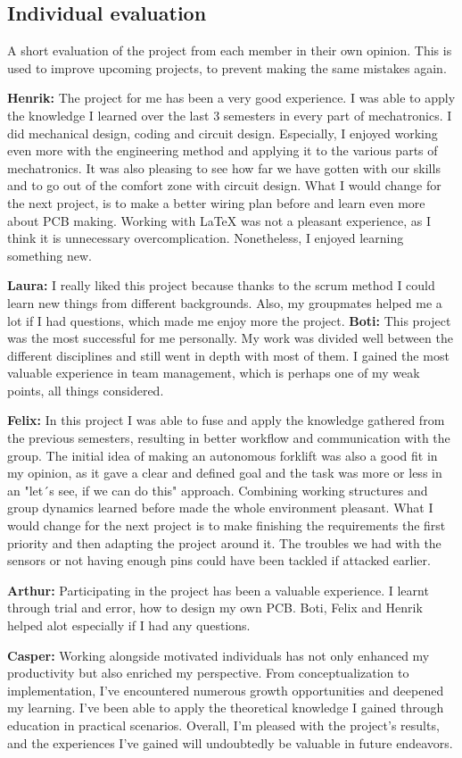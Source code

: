 \documentclass[../report.tex]{subfiles}
\begin{document}
\subsection{Individual evaluation}
A short evaluation of the project from each member in their own opinion. This is used to improve
upcoming projects, to prevent making the same mistakes again.

\textbf{Henrik:}
The project for me has been a very good experience. I was able to apply the knowledge
I learned over the last 3 semesters in every part of mechatronics. I did mechanical
design, coding and circuit design. Especially, I enjoyed working even more
with the engineering method and applying it to the various parts of mechatronics. 
It was also pleasing to see how far we have gotten with our skills and to go out of the comfort zone with circuit design. What I would change for the
next project, is to make a better wiring plan before and learn even more about PCB making.
Working with LaTeX was not a pleasant
experience, as I think it is unnecessary overcomplication. Nonetheless, I enjoyed learning something new.


\textbf{Laura:}
I really liked this project because thanks to the scrum method I could learn new things from different 
backgrounds. Also, my groupmates helped me a lot if I had questions, which made me enjoy more the project.
\textbf{Boti:}
This project was the most successful for me personally. My work was divided well between the different disciplines
and still went in depth with most of them. I gained the most valuable experience in team management, which is perhaps one of
my weak points, all things considered.

\textbf{Felix:}
In this project I was able to fuse and apply the knowledge gathered from the previous semesters, resulting in better 
workflow and communication with the group. The initial idea of making an autonomous forklift was also a good fit 
in my opinion, as it gave a clear and defined goal and the task was more or less in an "let´s see, if we can do this" 
approach. Combining working structures and group dynamics learned before made the whole environment pleasant.  What I would 
change for the next project is to make finishing the requirements the first priority and then adapting the project around it. 
The troubles we had with the sensors or not having enough pins could have been tackled if attacked earlier.



\textbf{Arthur:}
Participating in the project has been a valuable experience. I learnt through trial and error, how to design my own PCB. Boti, Felix and Henrik helped alot especially if I had any questions. 


\textbf{Casper:}
Working alongside motivated individuals has not only enhanced my productivity
but also enriched my perspective.  From conceptualization to implementation,
I've encountered numerous growth opportunities and deepened my learning. I've
been able to apply the theoretical knowledge I gained through education in
practical scenarios. Overall, I'm pleased with the project's results, and the
experiences I've gained will undoubtedly be valuable in future endeavors.
\end{document}
